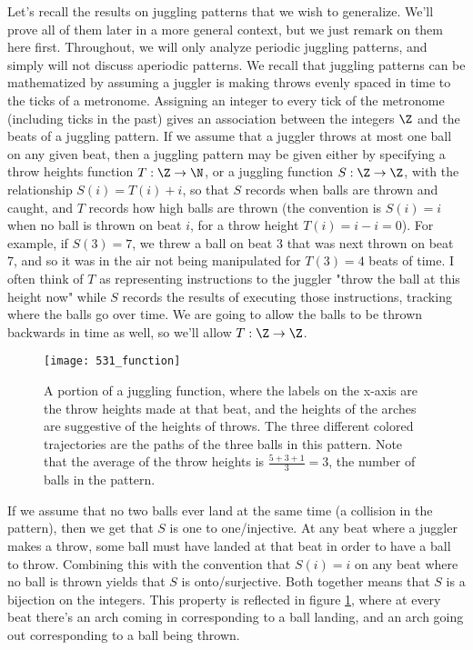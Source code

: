 \documentclass[12nt]{article}
\theoremstyle{plain}
\begin{document}
Let's recall the results on juggling patterns that we wish to generalize. We'll prove all of them later in a more general context, but we just remark on them here first. Throughout, we will only analyze periodic juggling patterns, and simply will not discuss aperiodic patterns. We recall that juggling patterns can be mathematized by assuming a juggler is making throws evenly spaced in time to the ticks of a metronome. Assigning an integer to every tick of the metronome (including ticks in the past) gives an association between the integers $\Z$ and the beats of a juggling pattern. If we assume that a juggler throws at most one ball on any given beat, then a juggling pattern may be given either by specifying a throw heights function $T : \Z \to \N$, or a juggling function $S : \Z \to \Z$, with the relationship $S(i) = T(i) + i$, so that $S$ records when balls are thrown and caught, and $T$ records how high balls are thrown (the convention is $S(i) = i$ when no ball is thrown on beat $i$, for a throw height $T(i) = i - i = 0$). For example, if $S(3) = 7$, we threw a ball on beat 3 that was next thrown on beat 7, and so it was in the air not being manipulated for $T(3) = 4$ beats of time. I often think of $T$ as representing instructions to the juggler "throw the ball at this height now" while $S$ records the results of executing those instructions, tracking where the balls go over time. We are going to allow the balls to be thrown backwards in time as well, so we'll allow $T : \Z \to \Z$. 

\begin{figure}[ht]
\texttt{[image: 531\_function]}
\caption{A portion of a juggling function, where the labels on the x-axis are the throw heights made at that beat, and the heights of the arches are suggestive of the heights of throws. The three different colored trajectories are the paths of the three balls in this pattern. Note that the average of the throw heights is $\frac{5 + 3 + 1}{3} = 3$, the number of balls in the pattern.}
\label{531_function}
\end{figure}


If we assume that no two balls ever land at the same time (a collision in the pattern), then we get that $S$ is one to one/injective. At any beat where a juggler makes a throw, some ball must have landed at that beat in order to have a ball to throw. Combining this with the convention that $S(i) = i$ on any beat where no ball is thrown yields that $S$ is onto/surjective. Both together means that $S$ is a bijection on the integers. This property is reflected in figure \ref{531_function}, where at every beat there's an arch coming in corresponding to a ball landing, and an arch going out corresponding to a ball being thrown. 
\end{document}
